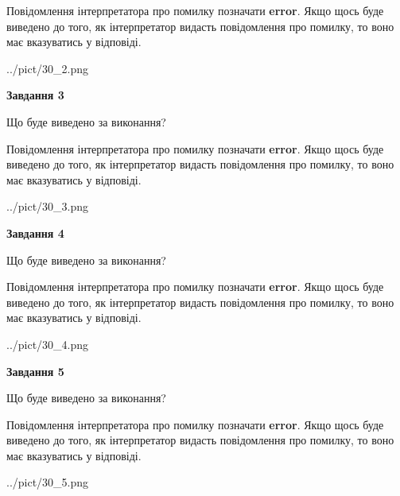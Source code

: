 \documentclass[12pt, ukrainian]{article}
\begin{document}
{\begin {large}
Повідомлення інтерпретатора про помилку позначати \textbf{error}.
Якщо щось буде виведено до того, як інтерпретатор видасть повідомлення про помилку, 
то воно має вказуватись у відповіді. \par


\begin{center}
	{../pict/30_2.png}
\end{center}
\newpage

{\begin {center}\textbf{Завдання 3}\end {center}}\par
Що буде виведено за виконання?

Повідомлення інтерпретатора про помилку позначати \textbf{error}.
Якщо щось буде виведено до того, як інтерпретатор видасть повідомлення про помилку, 
то воно має вказуватись у відповіді. \par


\begin{center}
	{../pict/30_3.png}
\end{center}
\newpage

{\begin {center}\textbf{Завдання 4}\end {center}}\par
Що буде виведено за виконання?

Повідомлення інтерпретатора про помилку позначати \textbf{error}.
Якщо щось буде виведено до того, як інтерпретатор видасть повідомлення про помилку, 
то воно має вказуватись у відповіді. \par


\begin{center}
	{../pict/30_4.png}
\end{center}
\newpage

{\begin {center}\textbf{Завдання 5}\end {center}}\par
Що буде виведено за виконання?

Повідомлення інтерпретатора про помилку позначати \textbf{error}.
Якщо щось буде виведено до того, як інтерпретатор видасть повідомлення про помилку, 
то воно має вказуватись у відповіді. \par


\begin{center}
	{../pict/30_5.png}
\end{center}
\newpage


\end{large}}
\end{document}
